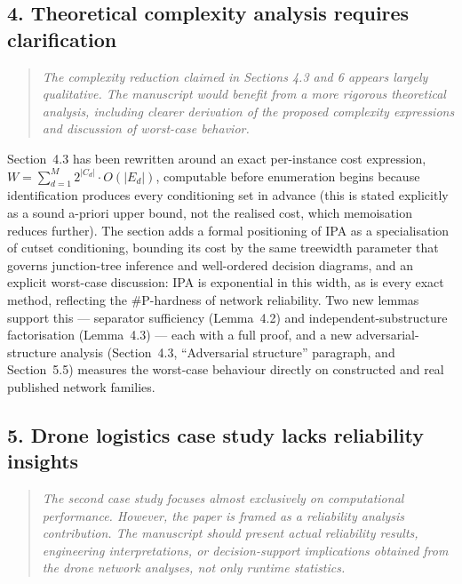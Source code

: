 \documentclass[11pt]{article}
\newenvironment{revcomment}
  {\begin{quote}\itshape\color{gray!60!black}}
  {\end{quote}}
\begin{document}
\subsection*{4. Theoretical complexity analysis requires clarification}
\begin{revcomment}
The complexity reduction claimed in Sections 4.3 and 6 appears largely qualitative. The manuscript would benefit from a more rigorous theoretical analysis, including clearer derivation of the proposed complexity expressions and discussion of worst-case behavior.
\end{revcomment}

Section~4.3 has been rewritten around an exact per-instance cost expression, $W = \sum_{d=1}^{M} 2^{|C_d|} \cdot O(|E_d|)$, computable before enumeration begins because identification produces every conditioning set in advance (this is stated explicitly as a sound a-priori upper bound, not the realised cost, which memoisation reduces further). The section adds a formal positioning of IPA as a specialisation of cutset conditioning, bounding its cost by the same treewidth parameter that governs junction-tree inference and well-ordered decision diagrams, and an explicit worst-case discussion: IPA is exponential in this width, as is every exact method, reflecting the \#P-hardness of network reliability. Two new lemmas support this --- separator sufficiency (Lemma~4.2) and independent-substructure factorisation (Lemma~4.3) --- each with a full proof, and a new adversarial-structure analysis (Section~4.3, ``Adversarial structure'' paragraph, and Section~5.5) measures the worst-case behaviour directly on constructed and real published network families.

\subsection*{5. Drone logistics case study lacks reliability insights}
\begin{revcomment}
The second case study focuses almost exclusively on computational performance. However, the paper is framed as a reliability analysis contribution. The manuscript should present actual reliability results, engineering interpretations, or decision-support implications obtained from the drone network analyses, not only runtime statistics.
\end{revcomment}
\end{document}
